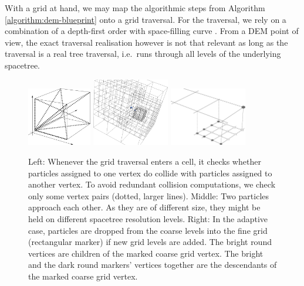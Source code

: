 With a grid at hand, we may map the algorithmic steps from Algorithm
\ref{algorithm:dem-blueprint} onto a grid traversal.
For the traversal, we rely on a combination of a depth-first order with
space-filling curve \cite{Weinzierl:2009:Diss,Weinzierl:11:Peano}.
From a DEM point of view, the exact traversal realisation however is not that
relevant as long as the traversal is a real tree traversal, i.e.~runs through
all levels of the underlying spacetree.

\begin{figure}
  \begin{center}
    \includegraphics[width=0.25\textwidth]{sketches/collision-cube.pdf}
    \hspace{0.2cm}
    \includegraphics[width=0.3\textwidth]{experiments/two-bodies/visualisation/adaptive-grid01.png}
    \hspace{0.2cm}
    \includegraphics[width=0.3\textwidth]{sketches/multigrid.pdf}
  \end{center}
  \caption{
    Left: Whenever the grid traversal enters a cell, it checks whether particles
    assigned to one vertex do collide with particles assigned to another vertex.
    To avoid redundant collision computations, we check only some vertex pairs
    (dotted, larger lines).
    Middle: Two particles approach each other. As they are of different size,
    they might be held on different spacetree resolution levels.
    Right: In the adaptive case, particles are dropped from the coarse levels
    into the fine grid (rectangular marker) if new grid levels are added. The
    bright round vertices are children of the marked coarse grid vertex. The
    bright and the dark round markers' vertices together are the descendants of
    the marked coarse grid vertex.
  }
  \label{figure:collision-cube}
\end{figure}


